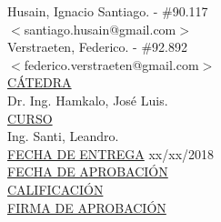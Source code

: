 \begin{titlepage}
\begin{tabbing}
		Husain, Ignacio Santiago.	\>\>- \#90.117\\
		\>\footnotesize{$<$santiago.husain@gmail.com$>$}\\
		
		Verstraeten, Federico.	\>\>- \#92.892\\
		\>\footnotesize{$<$federico.verstraeten@gmail.com$>$}\\
		
		\<\underline{CÁTEDRA}\\[0.2cm]
		Dr. Ing. Hamkalo, José Luis. \\
		
		\<\underline{CURSO}\\[0.2cm]
		Ing. Santi, Leandro. \\[1cm]
		
		\<\underline{FECHA DE ENTREGA}\>\>\> xx/xx/2018
		\\[0.2cm]
		
		\<\underline{FECHA DE APROBACIÓN}\>\>\> 
		\\[0.2cm]
		
		\<\underline{CALIFICACIÓN}\>\>\> 
		\\[0.2cm]
		
		\<\underline{FIRMA DE APROBACIÓN}
		\\[0.5cm]
		
	\end{tabbing}
	
	
	
	
\end{titlepage}

\clearpage

\tableofcontents							

\clearpage



